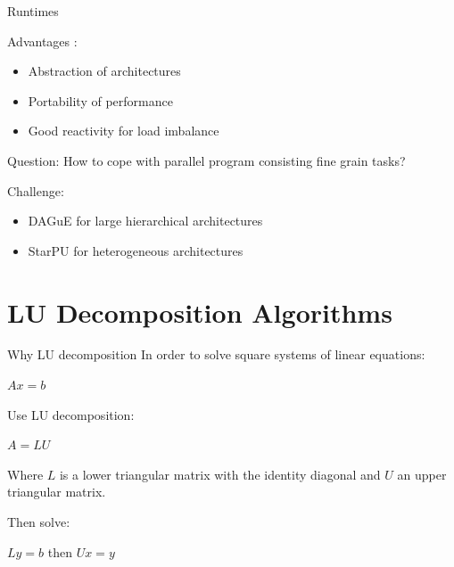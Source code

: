 \begin{frame}{Runtimes}
\begin{exampleblock}{Advantages :}
\begin{itemize}
\item Abstraction of architectures
\item Portability of performance
\item Good reactivity for load imbalance
\end{itemize}
\end{exampleblock}{}
\begin{exampleblock}{Question:}
How to cope with parallel program consisting fine grain tasks?
\end{exampleblock}{}
\begin{exampleblock}{Challenge:}
\begin{itemize}
\item DAGuE for large hierarchical architectures
\item StarPU for heterogeneous architectures
\end{itemize}
\end{exampleblock}{}
\end{frame}

\section{LU Decomposition Algorithms}

\begin{frame}{Why LU decomposition}
In order to solve square systems of linear equations:
\begin{center}
$Ax=b$
\end{center}
Use LU decomposition:
\begin{center}
$A=LU$
\end{center}
Where $L$ is a lower triangular matrix with the identity diagonal and $U$ an upper triangular matrix.

Then solve:
\begin{center}
$Ly=b$ then $Ux=y$
\end{center}
\end{frame}

